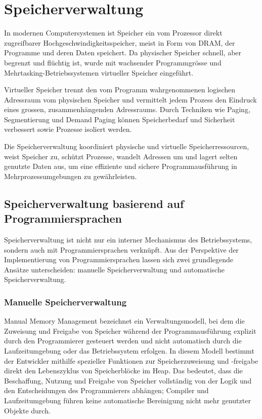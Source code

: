 \section{Speicherverwaltung}
\label{sec:Speicherverwaltung}
In modernen Computersystemen ist Speicher ein vom Prozessor direkt zugreifbarer Hochgeschwindigkeitsspeicher, 
meist in Form von DRAM, der Programme und deren Daten speichert\autocite{OperatingSystemConcepts}. 
Da physischer Speicher schnell, aber begrenzt und flüchtig ist, wurde mit wachsender Programmgrösse 
und Mehrtasking-Betriebssystemen virtueller Speicher eingeführt.

Virtueller Speicher trennt den vom Programm wahrgenommenen logischen Adressraum vom physischen Speicher 
und vermittelt jedem Prozess den Eindruck eines grossen, zusammenhängenden Adressraums\autocite{OperatingSystemConcepts}. 
Durch Techniken wie Paging, Segmentierung und Demand Paging können Speicherbedarf und Sicherheit verbessert 
sowie Prozesse isoliert werden\autocite{IntroductionandOverviewoftheMulticsSystem}.

Die Speicherverwaltung koordiniert physische und virtuelle Speicherressourcen, weist Speicher zu, schützt Prozesse, 
wandelt Adressen um und lagert selten genutzte Daten aus, um eine effiziente und sichere Programmausführung in 
Mehrprozessumgebungen zu gewährleisten\autocite{Operating}.
\subsection{Speicherverwaltung basierend auf Programmiersprachen}
\label{sec:Speicherverwaltung basierend auf Programmiersprachen}
Speicherverwaltung ist nicht nur ein interner Mechanismus des Betriebssystems, sondern auch mit 
Programmiersprachen verknüpft. Aus der Perspektive der Implementierung von Programmiersprachen lassen sich 
zwei grundlegende Ansätze unterscheiden: manuelle Speicherverwaltung und automatische Speicherverwaltung.

\subsubsection{Manuelle Speicherverwaltung}
\label{sec:Manuelle Speicherverwaltung}

Manual Memory Management bezeichnet ein Verwaltungsmodell, bei dem die Zuweisung und Freigabe von Speicher 
während der Programmausführung explizit durch den Programmierer gesteuert werden und nicht automatisch durch 
die Laufzeitumgebung oder das Betriebssystem erfolgen\autocite{TheCProgrammingLaunguage}. In diesem Modell bestimmt der 
Entwickler mithilfe spezieller Funktionen zur Speicherzuweisung und -freigabe direkt den Lebenszyklus von 
Speicherblöcke im Heap. Das bedeutet, dass die Beschaffung, Nutzung und Freigabe von Speicher vollständig 
von der Logik und den Entscheidungen des Programmierers abhängen; Compiler und Laufzeitumgebung führen 
keine automatische Bereinigung nicht mehr genutzter Objekte durch.

